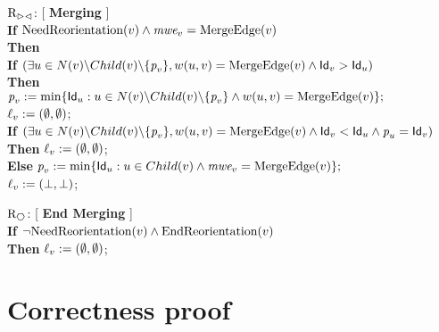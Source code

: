 \documentclass[11pt,a4paper]{article}
\newcommand{\id}{\mbox{\sf Id}}
\newcommand{\parent}{\mbox{\it p}}
\newcommand{\lab}{\mbox{\rm $\ell$}}
\newcommand{\m}{\mbox{\it mwe}}
\newcommand{\NeedReorientation}{\mbox{\rm NeedReorientation}}
\newcommand{\EndReorientation}{\mbox{\rm EndReorientation}}
\newcommand{\Fusion}{\mbox{\rm MergeEdge}}
\newcommand{\RF}{\mbox{\rm R$_{\vartriangleright \vartriangleleft}$}}
\newcommand{\REnd}{\mbox{\rm R$_{\hexagon}$}}
\begin{document}
\begin{description}
\item $\RF$: [ \textbf{Merging} ] \\
\textbf{If} $\NeedReorientation(v) \wedge \m_v=\Fusion(v)$\\
\textbf{Then}\\
\hspace*{0,5cm}\textbf{If } $(\exists u \in N(v) \backslash Child(v) \backslash \{\parent_v\}, w(u,v)=\Fusion(v) \wedge \id_v>\id_u)$\\
\hspace*{0,5cm}\textbf{Then }\\
\hspace*{0,9cm} $\parent_v:=\min\{\id_u: u \in N(v) \backslash Child(v) \backslash \{\parent_v\} \wedge w(u,v)=\Fusion(v)\};$\\
\hspace*{0,9cm} $\lab_v:=(\emptyset,\emptyset)$;\\
\hspace*{0,5cm}\textbf{If } $(\exists u \in N(v) \backslash Child(v) \backslash \{\parent_v\}, w(u,v)=\Fusion(v) \wedge \id_v<\id_u \wedge \parent_u=\id_v)$\\
\hspace*{0,5cm}\textbf{Then } $\lab_v:=(\emptyset,\emptyset)$;\\
\hspace*{0,5cm}\textbf{Else } $\parent_v:=\min\{\id_u: u \in Child(v) \wedge \m_v=\Fusion(v)\};$\\
\hspace*{1,4cm} $\lab_v:=(\bot,\bot)$;
\end{description}



\begin{description}
\item $\REnd$: [ \textbf{End Merging} ] \\
\textbf{If} $\neg \NeedReorientation(v) \wedge \EndReorientation(v)$\\
\textbf{Then} $\lab_v:=(\emptyset,\emptyset)$;
\end{description}









\section{Correctness proof}
\end{document}
